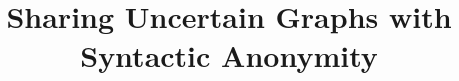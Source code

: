 \documentclass[letterpaper]{article}
\theoremstyle{plain}
\begin{document}
%
\title{Sharing Uncertain Graphs with Syntactic Anonymity}
\maketitle
\begin{abstract}
\begin{quote}
\end{quote}
\end{abstract}







% 
%  
\end{document}
